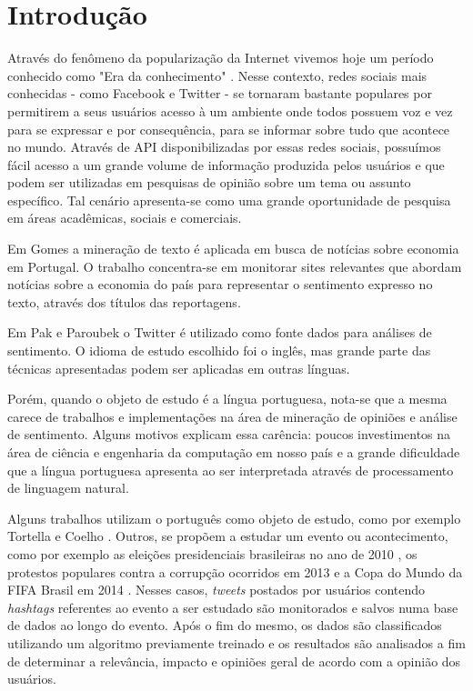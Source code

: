 \chapter{Introdução} \label{cap:1}

Através do fenômeno da popularização da Internet vivemos hoje um período conhecido como "Era da conhecimento" \cite{lastres1999informaccao}.
Nesse contexto, redes sociais mais conhecidas - como Facebook e Twitter - se tornaram bastante populares por permitirem a seus usuários acesso à um ambiente onde todos possuem voz e vez para se expressar e por consequência, para se informar sobre tudo que acontece no mundo.
Através de \ac{API} disponibilizadas por essas redes sociais, possuímos fácil acesso a um grande volume de informação produzida pelos usuários e que podem ser utilizadas em pesquisas de opinião sobre um tema ou assunto específico. Tal cenário apresenta-se como uma grande oportunidade de pesquisa em áreas acadêmicas, sociais e comerciais.

Em Gomes \cite{gomes2013text} a mineração de texto é aplicada em busca de notícias sobre economia em Portugal. O trabalho concentra-se em monitorar sites relevantes que abordam notícias sobre a economia do país para representar o sentimento expresso no texto, através dos títulos das reportagens.

Em Pak e Paroubek \cite{pak2010twitter} o Twitter é utilizado como fonte dados para análises de sentimento. O idioma de estudo escolhido foi o inglês, mas grande parte das técnicas apresentadas podem ser aplicadas em outras línguas.

Porém, quando o objeto de estudo é a língua portuguesa, nota-se que a mesma carece de trabalhos e implementações na área de mineração de opiniões e análise de sentimento. Alguns motivos explicam essa carência: poucos investimentos na área de ciência e engenharia da computação em nosso país e a grande dificuldade que a língua portuguesa apresenta ao ser interpretada através de processamento de linguagem natural. \cite{santos2000projecto}

Alguns trabalhos utilizam o português como objeto de estudo, como por exemplo Tortella e Coelho \cite{tortellaanalise}. Outros, se propõem a estudar um evento ou acontecimento, como por exemplo as eleições presidenciais brasileiras no ano de 2010 \cite{rodrigues2012characterizing}, os protestos populares contra a corrupção ocorridos em 2013 \cite{franca2014analise} e a Copa do Mundo da FIFA Brasil em 2014 \cite{carvalho2014mineraccao}. Nesses casos, \textit{tweets} postados por usuários contendo \textit{hashtags} referentes ao evento a ser estudado são monitorados e salvos numa base de dados ao longo do evento. Após o fim do mesmo, os dados são classificados utilizando um algoritmo previamente treinado e os resultados são analisados a fim de determinar a relevância, impacto e opiniões geral de acordo com a opinião dos usuários.

